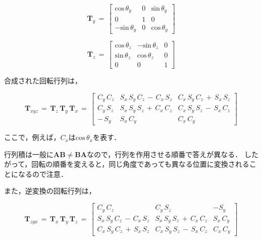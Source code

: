 \begin{equation}
{\bm T}_y \,=\,
\left[
\begin{array}{ccc}
\mathrm{cos}\,\theta_y & 0 & \mathrm{sin}\,\theta_y\\
0 & 1 & 0\\
\mathrm{-sin}\,\theta_y & 0 & \mathrm{cos}\,\theta_y
\end{array}
\right]
\label{eq:Ty}
\end{equation}

\begin{equation}
{\bm T}_z \,=\,
\left[
\begin{array}{ccc}
\mathrm{cos}\,\theta_z & \mathrm{-sin}\,\theta_z & 0\\
\mathrm{sin}\,\theta_z & \mathrm{cos}\,\theta_z & 0\\
0 & 0 & 1
\end{array}
\right]
\label{eq:Tz}
\end{equation}

\vspace{3mm}

合成された回転行列は，

\begin{equation}
{\bm T}_{xyz} \,=\, {\bm T}_z\, {\bm T}_y\, {\bm T}_x \,=\,
\left[
\begin{array}{ccc}
C_y\,C_z & S_x\,S_y\,C_z\,-\,C_x\,S_z & C_x\,S_y\,C_z\,+\,S_x\,S_z\\
C_y\,S_z & S_x\,S_y\,S_z\,+\,C_x\,C_z & C_x\,S_y\,S_z\,-\,S_x\,C_z\\
-\,S_y & S_x\,C_y & C_x\,C_y
\end{array}
\right]
\label{eq:Txyz}
\end{equation}

\noindent ここで，例えば，$C_x$は$\mathrm{cos}\,\theta_x$を表す．

行列積は一般に$\bm{AB} \neq \bm{BA}$なので，行列を作用させる順番で答えが異なる．
したがって，回転の順番を変えると，同じ角度であっても異なる位置に変換されることになるので注意．

また，逆変換の回転行列は，

\begin{equation}
{\bm T}_{zyx} \,=\, {\bm T}_x\, {\bm T}_y\, {\bm T}_z \,=\,
\left[
\begin{array}{ccc}
C_y\,C_z & C_y\,S_z & -S_y\\
S_x\,S_y\,C_z\,-\,C_x\,S_z & S_x\,S_y\,S_z\,+\,C_x\,C_z & S_x\,C_y\\
C_x\,S_y\,C_z\,+\,S_x\,S_z & C_x\,S_y\,S_z\,-\,S_x\,C_z & C_x\,C_y
\end{array}
\right]
\label{eq:Tzyx}
\end{equation}

